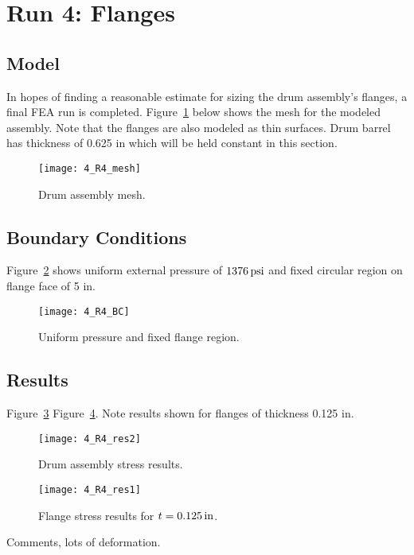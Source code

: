 \section{Run 4: Flanges}
\label{section:4_R4}
\subsection{Model}

In hopes of finding a reasonable estimate for sizing the drum assembly's flanges, a final FEA run is completed. Figure~\ref{fig:4_R4_mesh} below shows the mesh for the modeled assembly. Note that the flanges are also modeled as thin surfaces. Drum barrel has thickness of 0.625 in which will be held constant in this section.
\begin{figure}[H]
	\centering
	\texttt{[image: 4\_R4\_mesh]}
	\caption{Drum assembly mesh.}
	\label{fig:4_R4_mesh}
\end{figure}

\subsection{Boundary Conditions}

Figure~\ref{fig:4_R4_BC} shows uniform external pressure of $1376 \,\mathrm{psi}$ and fixed circular region on flange face of 5 in.
\begin{figure}[H]
	\centering
	\texttt{[image: 4\_R4\_BC]}
	\caption{Uniform pressure and fixed flange region.}
	\label{fig:4_R4_BC}
\end{figure}


\subsection{Results}

Figure~\ref{fig:4_R4_res2} Figure~\ref{fig:4_R4_res1}. Note results shown for flanges of thickness 0.125 in.

\begin{figure}[H]
	\centering
	\texttt{[image: 4\_R4\_res2]}
	\caption{Drum assembly stress results.}
	\label{fig:4_R4_res2}
\end{figure}
\begin{figure}[H]
	\centering
	\texttt{[image: 4\_R4\_res1]}
	\caption{Flange stress results for $t=0.125 \,\mathrm{in}$.}
	\label{fig:4_R4_res1}
\end{figure}

Comments, lots of deformation.\\


